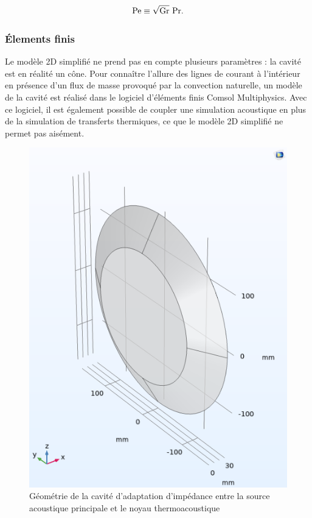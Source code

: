 \begin{equation}
	\mathrm{Pe} \equiv \sqrt{\mathrm{Gr}}~\mathrm{Pr}.
	\label{eq:NbrPeclet_GrashofFoisPrandtl}
\end{equation}


\subsubsection{\'Elements finis}
Le modèle 2D simplifié ne prend pas en compte plusieurs paramètres : la cavité est en réalité un cône. Pour connaître l'allure des lignes de courant à l'intérieur en présence d'un flux de masse provoqué par la convection naturelle, un modèle de la cavité est réalisé dans le logiciel d'éléments finis Comsol Multiphysics. Avec ce logiciel, il est également possible de coupler une simulation acoustique en plus de la simulation de transferts thermiques, ce que le modèle 2D simplifié ne permet pas aisément. 
\begin{figure}[!ht]
    \centering
    \includegraphics[width=.5\textwidth]{../fig/fig_ConvNatComsol/Geometry.png}
    \caption{Géométrie de la cavité d'adaptation d'impédance entre la source acoustique principale et le noyau thermoacoustique}
    \label{fig:CaviteConvNat_ComsolGeometrie}
\end{figure}

